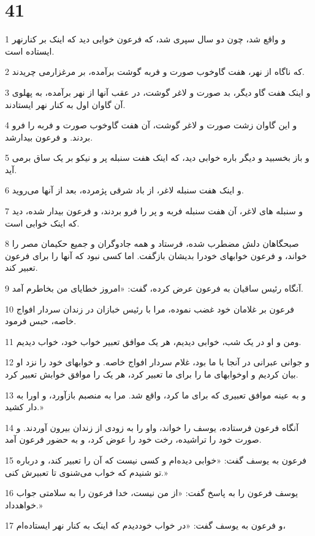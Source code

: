 \chapter{41}

\par 1 و واقع شد، چون دو سال سپری شد، که فرعون خوابی دید که اینک بر کنارنهر ایستاده است.
\par 2 که ناگاه از نهر، هفت گاوخوب صورت و فربه گوشت برآمده، بر مرغزارمی چریدند.
\par 3 و اینک هفت گاو دیگر، بد صورت و لاغر گوشت، در عقب آنها از نهر برآمده، به پهلوی آن گاوان اول به کنار نهر ایستادند.
\par 4 و این گاوان زشت صورت و لاغر گوشت، آن هفت گاوخوب صورت و فربه را فرو بردند. و فرعون بیدارشد.
\par 5 و باز بخسبید و دیگر باره خوابی دید، که اینک هفت سنبله پر و نیکو بر یک ساق برمی آید.
\par 6 و اینک هفت سنبله لاغر، از باد شرقی پژمرده، بعد از آنها می‌روید.
\par 7 و سنبله های لاغر، آن هفت سنبله فربه و پر را فرو بردند، و فرعون بیدار شده، دید که اینک خوابی است.
\par 8 صبحگاهان دلش مضطرب شده، فرستاد و همه جادوگران و جمیع حکیمان مصر را خواند، و فرعون خوابهای خودرا بدیشان باز‌گفت. اما کسی نبود که آنها را برای فرعون تعبیر کند.
\par 9 آنگاه رئیس ساقیان به فرعون عرض کرده، گفت: «امروز خطایای من بخاطرم آمد.
\par 10 فرعون بر غلامان خود غضب نموده، مرا با رئیس خبازان در زندان سردار افواج خاصه، حبس فرمود.
\par 11 ومن و او در یک شب، خوابی دیدیم، هر یک موافق تعبیر خواب خود، خواب دیدیم.
\par 12 و جوانی عبرانی در آنجا با ما بود، غلام سردار افواج خاصه. و خوابهای خود را نزد او بیان کردیم و اوخوابهای ما را برای ما تعبیر کرد، هر یک را موافق خوابش تعبیر کرد.
\par 13 و به عینه موافق تعبیری که برای ما کرد، واقع شد. مرا به منصبم بازآورد، و اورا به دار کشید.»
\par 14 آنگاه فرعون فرستاده، یوسف را خواند، واو را به زودی از زندان بیرون آوردند. و صورت خود را تراشیده، رخت خود را عوض کرد، و به حضور فرعون آمد.
\par 15 فرعون به یوسف گفت: «خوابی دیده‌ام و کسی نیست که آن را تعبیر کند، و درباره تو شنیدم که خواب می‌شنوی تا تعبیرش کنی.»
\par 16 یوسف فرعون را به پاسخ گفت: «از من نیست، خدا فرعون را به سلامتی جواب خواهدداد.»
\par 17 و فرعون به یوسف گفت: «در خواب خوددیدم که اینک به کنار نهر ایستاده‌ام،
